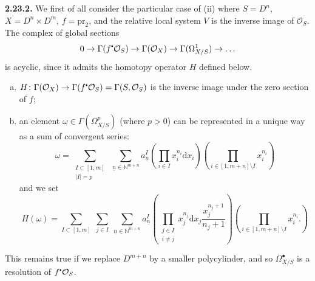 \documentclass{report}
\newenvironment{rmenv}[1]
  {\phantomsection\par\medskip\noindent\textbf{#1.}\rmfamily}
  {\par\medskip}
\renewcommand{\cal}[1]{{\mathcal{#1}}}
\newcommand{\sbullet}{{\mathbin{\vcenter{\hbox{\scalebox{.5}{$\bullet$}}}}}}
\newcommand{\NN}{\mathbb{N}}
\newcommand{\dd}{\mathrm{d}}
\newcommand{\pr}{\mathrm{pr}}
\newcommand{\oldpage}[1]{\marginpar{\footnotesize$\Big\vert$ \textit{p.~#1}}}
\begin{document}
\begin{rmenv}{2.23.2}
\label{I.2.23.2}
  We first of all consider the particular case of (ii) where $S=D^n$, $X=D^n\times D^m$, $f=\pr_2$, and the relative local system $V$ is the inverse image of $\cal{O}_S$.
  The complex of global sections
  \[
    0 \to \Gamma(f^\sbullet\cal{O}_S) \to \Gamma(\cal{O}_X) \to \Gamma(\Omega_{X/S}^1) \to \ldots
  \]
  is acyclic, since it admits the homotopy operator $H$ defined below.
\oldpage{16}
  \begin{enumerate}[a)]
    \item $H\colon \Gamma(\cal{O}_X) \to \Gamma(f^\sbullet\cal{O}_S) = \Gamma(S,\cal{O}_S)$ is the inverse image under the zero section of $f$;
    \item an element $\omega\in\Gamma(\Omega_{X/S}^p)$ (where $p>0$) can be represented in a unique way as a sum of convergent series:
      \[
        \omega = \sum_{\substack{I\subset[1,m]\\|I|=p}} \; \sum_{\underline{n}\in \NN^{m+n}} a_{\underline{n}}^I
        \left(
          \prod_{i\in I} x_i^{n_i}\dd x_i
        \right)
        \left(
          \prod_{i\in[1,m+n]\setminus I} x_i^{n_i}
        \right)
      \]
      and we set
      \[
        H(\omega) = \sum_{I\subset[1,m]} \; \sum_{j\in I} \; \sum_{\underline{n}\in\NN^{m+n}} a_{\underline{n}}^I
        \left(
          \prod_{\substack{j\in I\\i\neq j}} x_j^{n_j}\dd x_j \frac{x_j^{n_j+1}}{n_j+1}
        \right)
        \left(
          \prod_{i\in[1,m+n]\setminus I} x_i^{n_i}.
        \right)
      \]
  \end{enumerate}

  This remains true if we replace $D^{m+n}$ by a smaller polycylinder, and so $\Omega_{X/S}^\bullet$ is a resolution of $f^\sbullet\cal{O}_S$.
\end{rmenv}
\end{document}
